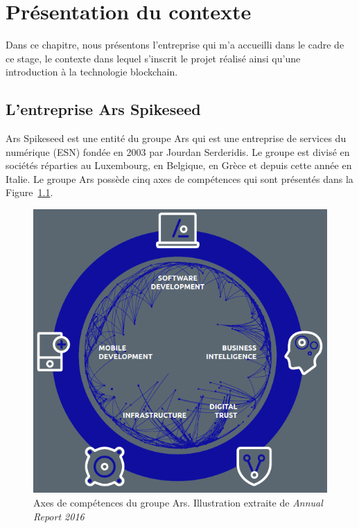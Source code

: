 \documentclass{tnreport}
\begin{document}
\chapter{Présentation du contexte}

Dans ce chapitre, nous présentons l'entreprise qui m'a accueilli dans le cadre de ce stage, le contexte dans lequel s'inscrit le projet réalisé ainsi qu'une introduction à la technologie blockchain.

\section{L'entreprise Ar{\texteta}s Spikeseed}

Ar{\texteta}s Spikeseed est une entité du groupe Ar{\texteta}s qui est une entreprise de services du numérique (ESN) fondée en 2003 par Jourdan Serderidis. 
Le groupe est divisé en sociétés réparties au Luxembourg, en Belgique, en Grèce et depuis cette année en Italie. Le groupe Ar{\texteta}s possède cinq axes de compétences qui sont présentés dans la Figure~\ref{fig:arhs-core-services}.

\begin{figure}[h]
	\centering
	\includegraphics[scale=0.7]{figures/arhs-core-services}
	\caption{Axes de compétences du groupe Ar{\texteta}s. Illustration extraite de \textit{Annual Report 2016}~\cite{annual-report}}
	\label{fig:arhs-core-services}
\end{figure}
\end{document}
